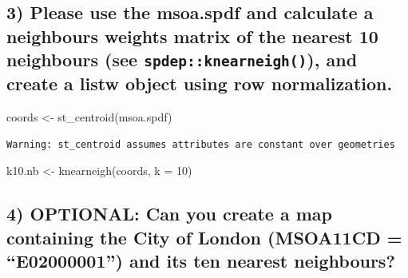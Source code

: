 \documentclass[
  letterpaper,
]{scrbook}
\newenvironment{Shaded}{\begin{snugshade}}{\end{snugshade}}
\newcommand{\AttributeTok}[1]{\textcolor[rgb]{0.40,0.45,0.13}{#1}}
\newcommand{\DecValTok}[1]{\textcolor[rgb]{0.68,0.00,0.00}{#1}}
\newcommand{\FunctionTok}[1]{\textcolor[rgb]{0.28,0.35,0.67}{#1}}
\newcommand{\NormalTok}[1]{\textcolor[rgb]{0.00,0.23,0.31}{#1}}
\newcommand{\OtherTok}[1]{\textcolor[rgb]{0.00,0.23,0.31}{#1}}
\begin{document}
\hypertarget{please-use-the-msoa.spdf-and-calculate-a-neighbours-weights-matrix-of-the-nearest-10-neighbours-see-spdepknearneigh-and-create-a-listw-object-using-row-normalization.}{%
\subsection*{\texorpdfstring{3) Please use the msoa.spdf and calculate a
neighbours weights matrix of the nearest 10 neighbours (see
\texttt{spdep::knearneigh()}), and create a listw object using row
normalization.}{3) Please use the msoa.spdf and calculate a neighbours weights matrix of the nearest 10 neighbours (see spdep::knearneigh()), and create a listw object using row normalization.}}\label{please-use-the-msoa.spdf-and-calculate-a-neighbours-weights-matrix-of-the-nearest-10-neighbours-see-spdepknearneigh-and-create-a-listw-object-using-row-normalization.}}

\begin{Shaded}
\begin{Highlighting}[]
\NormalTok{coords }\OtherTok{\textless{}{-}} \FunctionTok{st\_centroid}\NormalTok{(msoa.spdf)}
\end{Highlighting}
\end{Shaded}

\begin{verbatim}
Warning: st_centroid assumes attributes are constant over geometries
\end{verbatim}

\begin{Shaded}
\begin{Highlighting}[]
\NormalTok{k10.nb }\OtherTok{\textless{}{-}} \FunctionTok{knearneigh}\NormalTok{(coords, }\AttributeTok{k =} \DecValTok{10}\NormalTok{)}
\end{Highlighting}
\end{Shaded}

\hypertarget{optional-can-you-create-a-map-containing-the-city-of-london-msoa11cd-e02000001-and-its-ten-nearest-neighbours}{%
\subsection*{4) OPTIONAL: Can you create a map containing the City of
London (MSOA11CD = ``E02000001'') and its ten nearest
neighbours?}\label{optional-can-you-create-a-map-containing-the-city-of-london-msoa11cd-e02000001-and-its-ten-nearest-neighbours}}
\end{document}
